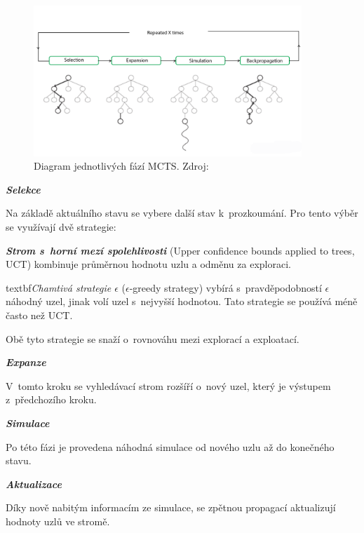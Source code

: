 \begin{figure}[H]
	\centering
	\includegraphics[width=0.9\textwidth]{obrazky-figures/mcts}
	\caption{Diagram jednotlivých fází MCTS.\@
  Zdroj:~\cite{mcts_geeksforgeeks}}\label{fig:mcts}
\end{figure}
\pagebreak
\begin{myitemize}
  \item \textbf{\emph{Selekce}}

  Na základě aktuálního stavu se vybere další stav k~prozkoumání.
  Pro tento výběr se využívají dvě strategie:
  
  \textbf{\emph{Strom s~horní mezí spolehlivosti}} (Upper confidence bounds applied to trees, UCT) kombinuje průměrnou hodnotu uzlu a odměnu za exploraci.

  \label{epsilon_greedy}
  textbf{\emph{Chamtivá strategie $\epsilon$ }} ($\epsilon$-greedy strategy) vybírá s~pravděpodobností $\epsilon$ náhodný uzel, jinak volí uzel s~nejvyšší hodnotou.
  Tato strategie se používá méně často než UCT\@.

  Obě tyto strategie se snaží o~rovnováhu mezi explorací a exploatací.
  \item \textbf{\emph{Expanze}}

  V~tomto kroku se vyhledávací strom rozšíří o~nový uzel, který je výstupem z~předchozího kroku.

  \item \textbf{\emph{Simulace}}

  Po této fázi je provedena náhodná simulace od nového uzlu až do konečného stavu.

  \item \textbf{\emph{Aktualizace}}
  
  Díky nově nabitým informacím ze simulace, se zpětnou propagací aktualizují hodnoty uzlů ve stromě.
\end{myitemize}


